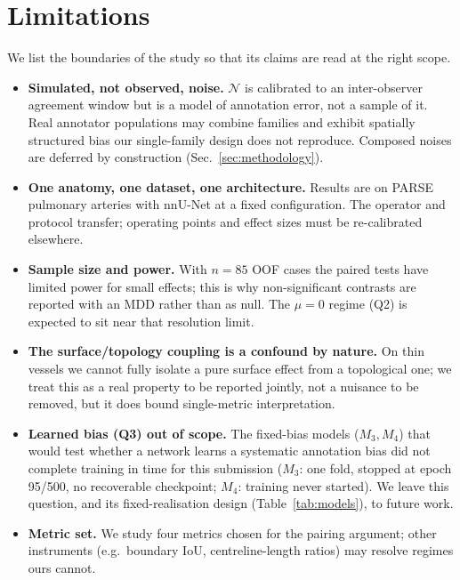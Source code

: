 \documentclass[
    bookmarks, bookmarksnumbered, bookmarksopen,
    colorlinks=true, citecolor=blue, linkcolor=blue, urlcolor=blue
]{techrep}
\newcommand{\Nop}{\ensuremath{\mathcal{N}}}
\newcommand{\Ncases}{85}   %
\begin{document}
\chapter{Limitations}\label{sec:limitations}
We list the boundaries of the study so that its claims are read at the right scope.
\begin{itemize}[leftmargin=1.4em,itemsep=2pt]
  \item \textbf{Simulated, not observed, noise.} $\Nop$ is calibrated to an inter-observer
  agreement window but is a model of annotation error, not a sample of it. Real annotator
  populations may combine families and exhibit spatially structured bias our single-family
  design does not reproduce. Composed noises are deferred by construction
  (Sec.~\ref{sec:methodology}).
  \item \textbf{One anatomy, one dataset, one architecture.} Results are on PARSE pulmonary
  arteries with nnU-Net at a fixed configuration. The operator and protocol transfer;
  operating points and effect sizes must be re-calibrated elsewhere.
  \item \textbf{Sample size and power.} With $n{=}\Ncases$ OOF cases the paired tests have
  limited power for small effects; this is why non-significant contrasts are reported with an
  MDD rather than as null. The $\mu{=}0$ regime (Q2) is expected to sit near that resolution
  limit.
  \item \textbf{The surface/topology coupling is a confound by nature.} On thin vessels we
  cannot fully isolate a pure surface effect from a topological one; we treat this as a real
  property to be reported jointly, not a nuisance to be removed, but it does bound
  single-metric interpretation.
  \item \textbf{Learned bias (Q3) out of scope.} The fixed-bias models ($M_3,M_4$) that would
  test whether a network learns a systematic annotation bias did not complete training in time
  for this submission ($M_3$: one fold, stopped at epoch 95/500, no recoverable checkpoint;
  $M_4$: training never started). We leave this question, and its fixed-realisation design
  (Table~\ref{tab:models}), to future work.
  \item \textbf{Metric set.} We study four metrics chosen for the pairing argument; other
  instruments (e.g.\ boundary IoU, centreline-length ratios) may resolve regimes ours cannot.
\end{itemize}

\end{document}
